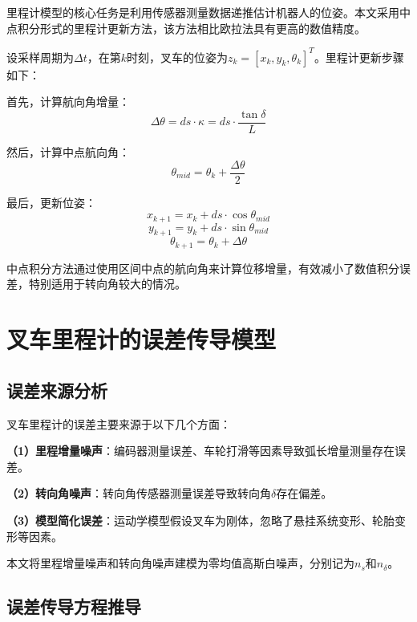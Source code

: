 \documentclass[12pt,a4paper]{article}
\begin{document}
里程计模型的核心任务是利用传感器测量数据递推估计机器人的位姿。本文采用中点积分形式的里程计更新方法，该方法相比欧拉法具有更高的数值精度。

设采样周期为$\Delta t$，在第$k$时刻，叉车的位姿为$z_k=[x_k,y_k,\theta_k]^T$。里程计更新步骤如下：

首先，计算航向角增量：
\begin{equation}
\Delta\theta = ds \cdot \kappa = ds \cdot \frac{\tan\delta}{L}
\end{equation}

然后，计算中点航向角：
\begin{equation}
\theta_{mid} = \theta_k + \frac{\Delta\theta}{2}
\end{equation}

最后，更新位姿：
\begin{equation}
x_{k+1} = x_k + ds \cdot \cos\theta_{mid}
\end{equation}
\begin{equation}
y_{k+1} = y_k + ds \cdot \sin\theta_{mid}
\end{equation}
\begin{equation}
\theta_{k+1} = \theta_k + \Delta\theta
\end{equation}

中点积分方法通过使用区间中点的航向角来计算位移增量，有效减小了数值积分误差，特别适用于转向角较大的情况。

\section{叉车里程计的误差传导模型}

\subsection{误差来源分析}

叉车里程计的误差主要来源于以下几个方面：

\textbf{（1）里程增量噪声}：编码器测量误差、车轮打滑等因素导致弧长增量测量存在误差。

\textbf{（2）转向角噪声}：转向角传感器测量误差导致转向角$\delta$存在偏差。

\textbf{（3）模型简化误差}：运动学模型假设叉车为刚体，忽略了悬挂系统变形、轮胎变形等因素。

本文将里程增量噪声和转向角噪声建模为零均值高斯白噪声，分别记为$n_s$和$n_\delta$。

\subsection{误差传导方程推导}
\end{document}
